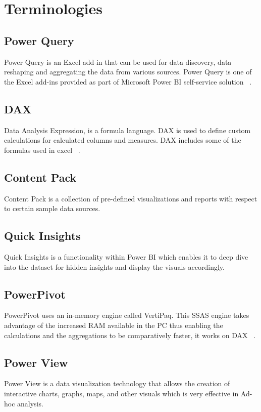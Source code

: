 \section{Terminologies}

\subsection{Power Query}
Power Query is an Excel add-in that can be used for data 
discovery, data reshaping and aggregating the data from various sources. 
Power Query is one of the Excel add-ins provided as part of Microsoft Power 
BI self-service solution ~\cite{hid-sp18-418-power bi-intro}.

\subsection{DAX}
Data Analysis Expression, is a formula language. DAX is used to define 
custom calculations for calculated columns and measures. DAX includes some of 
the formulas used in excel ~\cite{hid-sp18-418-dax-basics}.

\subsection{Content Pack}
Content Pack is a collection of pre-defined visualizations and reports 
with respect to certain sample data sources.

\subsection{Quick Insights}
Quick Insights is a functionality within Power BI which enables it to 
deep dive into the dataset for hidden insights and display the 
visuals accordingly.

\subsection{PowerPivot}
PowerPivot uses an in-memory engine called VertiPaq. 
This SSAS engine takes advantage of the increased RAM available in the 
PC thus enabling the calculations and the aggregations to be comparatively 
faster, it works on DAX ~\cite{hid-sp18-418-power pivot}.

\subsection{Power View}
Power View is a data visualization technology that allows the 
creation of interactive charts, graphs, maps, and other visuals which is 
very effective in Ad-hoc analysis.

